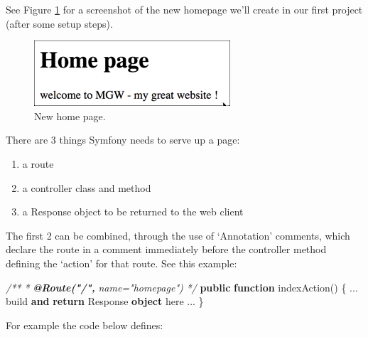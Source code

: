 \documentclass[a4paperpaper,openright]{book}
\newenvironment{Shaded}{}{}
\newcommand{\AnnotationTok}[1]{\textcolor[rgb]{0.38,0.63,0.69}{\textbf{\textit{#1}}}}
\newcommand{\CommentTok}[1]{\textcolor[rgb]{0.38,0.63,0.69}{\textit{#1}}}
\newcommand{\KeywordTok}[1]{\textcolor[rgb]{0.00,0.44,0.13}{\textbf{#1}}}
\newcommand{\NormalTok}[1]{#1}
\newcommand{\OtherTok}[1]{\textcolor[rgb]{0.00,0.44,0.13}{#1}}
\newcommand{\StringTok}[1]{\textcolor[rgb]{0.25,0.44,0.63}{#1}}
\providecommand{\tightlist}{%
  \setlength{\itemsep}{0pt}\setlength{\parskip}{0pt}}
\begin{document}
See Figure \ref{new_home_page} for a screenshot of the new homepage
we'll create in our first project (after some setup steps).

\begin{figure}
\centering
\includegraphics{./tex2pdf.-65f13e14688ab55b/9fd62910f505d54b27171036acbf12dafc5b8057.png}
\caption{New home page.\label{new_home_page}}
\end{figure}

There are 3 things Symfony needs to serve up a page:

\begin{enumerate}
\def\labelenumi{\arabic{enumi}.}
\tightlist
\item
  a route
\item
  a controller class and method
\item
  a Response object to be returned to the web client
\end{enumerate}

The first 2 can be combined, through the use of `Annotation' comments,
which declare the route in a comment immediately before the controller
method defining the `action' for that route. See this example:

\begin{Shaded}
\begin{Highlighting}[]
    \CommentTok{/**}
\CommentTok{     * }\AnnotationTok{@Route("/",}\CommentTok{ name="homepage")}
\CommentTok{     */}
    \KeywordTok{public} \KeywordTok{function}\NormalTok{ indexAction}\OtherTok{()}
\NormalTok{    \{}
        \StringTok{...}\NormalTok{ build }\KeywordTok{and} \KeywordTok{return}\NormalTok{ Response }\KeywordTok{object}\NormalTok{ here }\StringTok{...}
\NormalTok{    \}}
\end{Highlighting}
\end{Shaded}

For example the code below defines:
\end{document}
